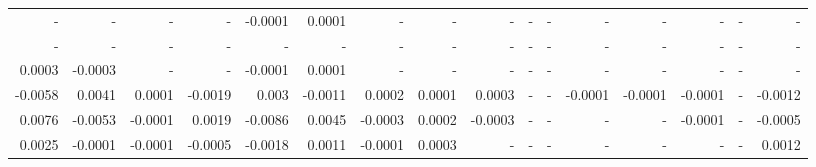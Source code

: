 \documentclass[12pt]{amsart}
\begin{document}
\begin{table}[h]
\begin{center}
\begin{tabular}{r r r r r r r r r r r r r r r r}
     -  &        -   &       -  &        -  &   -0.0001   &    0.0001   &        -  &        -   &       -    &      -     &     -  &        -  &        -  &        -    &      -   &       -        \\
     -  &        -   &       -  &        -  &        -  &        -  &        -  &        -   &       -    &      -     &     -  &        -  &        -  &        -    &      -   &       -        \\
 0.0003   &   -0.0003    &       -  &        -  &   -0.0001   &    0.0001   &        -  &        -   &       -    &      -     &     -  &        -  &        -  &        -    &      -   &       -        \\
-0.0058   &    0.0041    &   0.0001   &   -0.0019   &     0.003   &   -0.0011   &    0.0002   &    0.0001    &   0.0003     &      -     &     -  &   -0.0001   &   -0.0001   &   -0.0001     &      -   &  -0.0012         \\
 0.0076   &   -0.0053    &  -0.0001   &    0.0019   &   -0.0086   &    0.0045   &   -0.0003   &    0.0002    &  -0.0003     &      -     &     -  &        -  &        -  &   -0.0001     &      -   &  -0.0005         \\
 0.0025   &   -0.0001    &  -0.0001   &   -0.0005   &   -0.0018   &    0.0011   &   -0.0001   &    0.0003    &       -    &      -     &     -  &        -  &        -  &        -    &      -   &   0.0012         \\	
		\end{tabular}
	\end{center}
\end{table}
\end{document}
